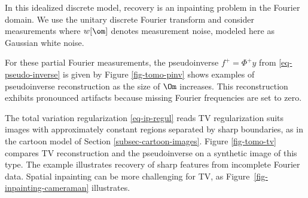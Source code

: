In this idealized discrete model, recovery is an inpainting problem in the Fourier domain. We use the unitary discrete Fourier transform and consider measurements
where $w[\om]$ denotes measurement noise, modeled here as Gaussian white noise.


For these partial Fourier measurements, the pseudoinverse $f^+ = \Phi^+ y$ from \eqref{eq-pseudo-inverse} is given by
Figure \ref{fig-tomo-pinv} shows examples of pseudoinverse reconstruction as the size of $\Om$ increases. This reconstruction exhibits pronounced artifacts because missing Fourier frequencies are set to zero.

The total variation regularization \eqref{eq-ip-regul} reads
TV regularization suits images with approximately constant regions separated by sharp boundaries, as in the cartoon model of Section \ref{subsec-cartoon-images}. Figure \ref{fig-tomo-tv} compares TV reconstruction and the pseudoinverse on a synthetic image of this type. The example illustrates recovery of sharp features from incomplete Fourier data. Spatial inpainting can be more challenging for TV, as Figure~\ref{fig-inpainting-cameraman} illustrates.

